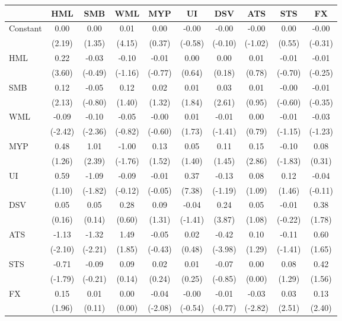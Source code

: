 \begin{tabular}{l*{9}{c}}
\hline
\hline
& HML& SMB& WML& MYP& UI& DSV& ATS& STS& FX\\
\hline
Constant & 0.00 & 0.00 & 0.01 & 0.00 & -0.00 & -0.00 & -0.00 & 0.00 & -0.00\\
   & (2.19) & (1.35) & (4.15) & (0.37) & (-0.58) & (-0.10) & (-1.02) & (0.55) & (-0.31)\\
HML & 0.22 & -0.03 & -0.10 & -0.01 & 0.00 & 0.00 & 0.01 & -0.01 & -0.01\\
   & (3.60) & (-0.49) & (-1.16) & (-0.77) & (0.64) & (0.18) & (0.78) & (-0.70) & (-0.25)\\
SMB & 0.12 & -0.05 & 0.12 & 0.02 & 0.01 & 0.03 & 0.01 & -0.00 & -0.01\\
   & (2.13) & (-0.80) & (1.40) & (1.32) & (1.84) & (2.61) & (0.95) & (-0.60) & (-0.35)\\
WML & -0.09 & -0.10 & -0.05 & -0.00 & 0.01 & -0.01 & 0.00 & -0.01 & -0.03\\
   & (-2.42) & (-2.36) & (-0.82) & (-0.60) & (1.73) & (-1.41) & (0.79) & (-1.15) & (-1.23)\\
MYP & 0.48 & 1.01 & -1.00 & 0.13 & 0.05 & 0.11 & 0.15 & -0.10 & 0.08\\
   & (1.26) & (2.39) & (-1.76) & (1.52) & (1.40) & (1.45) & (2.86) & (-1.83) & (0.31)\\
UI & 0.59 & -1.09 & -0.09 & -0.01 & 0.37 & -0.13 & 0.08 & 0.12 & -0.04\\
   & (1.10) & (-1.82) & (-0.12) & (-0.05) & (7.38) & (-1.19) & (1.09) & (1.46) & (-0.11)\\
DSV & 0.05 & 0.05 & 0.28 & 0.09 & -0.04 & 0.24 & 0.05 & -0.01 & 0.38\\
   & (0.16) & (0.14) & (0.60) & (1.31) & (-1.41) & (3.87) & (1.08) & (-0.22) & (1.78)\\
ATS & -1.13 & -1.32 & 1.49 & -0.05 & 0.02 & -0.42 & 0.10 & -0.11 & 0.60\\
   & (-2.10) & (-2.21) & (1.85) & (-0.43) & (0.48) & (-3.98) & (1.29) & (-1.41) & (1.65)\\
STS & -0.71 & -0.09 & 0.09 & 0.02 & 0.01 & -0.07 & 0.00 & 0.08 & 0.42\\
   & (-1.79) & (-0.21) & (0.14) & (0.24) & (0.25) & (-0.85) & (0.00) & (1.29) & (1.56)\\
FX & 0.15 & 0.01 & 0.00 & -0.04 & -0.00 & -0.01 & -0.03 & 0.03 & 0.13\\
   & (1.96) & (0.11) & (0.00) & (-2.08) & (-0.54) & (-0.77) & (-2.82) & (2.51) & (2.40)\\
\hline
\hline
\end{tabular}

